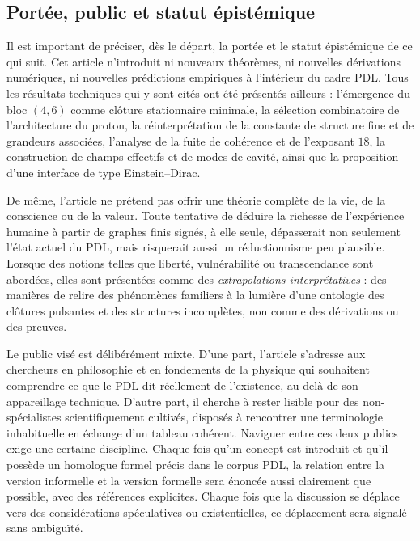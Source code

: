 \documentclass[11pt,a4paper]{article}
\theoremstyle{definition}
\begin{document}
\subsection{Portée, public et statut épistémique}

Il est important de préciser, dès le départ, la portée et le statut épistémique de ce qui suit. Cet article n’introduit ni nouveaux théorèmes, ni nouvelles dérivations numériques, ni nouvelles prédictions empiriques à l’intérieur du cadre PDL. Tous les résultats techniques qui y sont cités ont été présentés ailleurs : l’émergence du bloc \((4,6)\) comme clôture stationnaire minimale, la sélection combinatoire de l’architecture du proton, la réinterprétation de la constante de structure fine et de grandeurs associées, l’analyse de la fuite de cohérence et de l’exposant \(18\), la construction de champs effectifs et de modes de cavité, ainsi que la proposition d’une interface de type Einstein–Dirac.\cite{Laubscher_MinimalClosures_46_2024,Laubscher_ProtonArch_v2_2024,Laubscher_Alpha_v2_2024,Laubscher_Exponent18_v2_2024,Laubscher_EffectiveFields_2024,Laubscher_CavityModes_PDL_2024,Laubscher_Einstein_Dirac_2024}

De même, l’article ne prétend pas offrir une théorie complète de la vie, de la conscience ou de la valeur. Toute tentative de déduire la richesse de l’expérience humaine à partir de graphes finis signés, à elle seule, dépasserait non seulement l’état actuel du PDL, mais risquerait aussi un réductionnisme peu plausible. Lorsque des notions telles que liberté, vulnérabilité ou transcendance sont abordées, elles sont présentées comme des \emph{extrapolations interprétatives} : des manières de relire des phénomènes familiers à la lumière d’une ontologie des clôtures pulsantes et des structures incomplètes, non comme des dérivations ou des preuves.\cite{Laubscher_Existence_PulsatingClosure_2026,Laubscher_PDL_TO_Dialogue_2024}

Le public visé est délibérément mixte. D’une part, l’article s’adresse aux chercheurs en philosophie et en fondements de la physique qui souhaitent comprendre ce que le PDL dit réellement de l’existence, au-delà de son appareillage technique. D’autre part, il cherche à rester lisible pour des non-spécialistes scientifiquement cultivés, disposés à rencontrer une terminologie inhabituelle en échange d’un tableau cohérent. Naviguer entre ces deux publics exige une certaine discipline. Chaque fois qu’un concept est introduit et qu’il possède un homologue formel précis dans le corpus PDL, la relation entre la version informelle et la version formelle sera énoncée aussi clairement que possible, avec des références explicites. Chaque fois que la discussion se déplace vers des considérations spéculatives ou existentielles, ce déplacement sera signalé sans ambiguïté.
\end{document}
